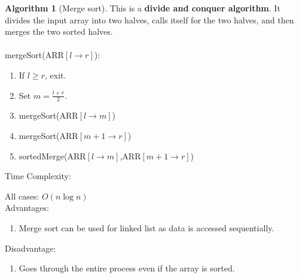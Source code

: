 \documentclass[10pt, a4paper]{extarticle}
\theoremstyle{definition}
\newtheorem{alg}{Algorithm}
\begin{document}
\begin{alg}[Merge sort]
	This is a \textbf{divide and conquer algorithm}. It divides the input array into two halves, calls itself for the two halves, and then merges the two sorted halves.\\ \\
	mergeSort(ARR$[l\to r]$):
	\begin{enumerate}
		\item If $l\geq r$, exit.
		\item Set $m=\frac{l+r}{2}$.
		\item mergeSort(ARR$[l\to m]$)
		\item mergeSort(ARR$[m+1\to r]$)
		\item sortedMerge(ARR$[l\to m]$,ARR$[m+1\to r]$)
	\end{enumerate}
	Time Complexity:

	All cases: $O(n\log n)$
	\hfill\\
	Advantages:
	\begin{enumerate}
		\item Merge sort can be used for linked list as data is accessed sequentially.
	\end{enumerate}
	Disadvantage:
	\begin{enumerate}
		\item Goes through the entire process even if the array is sorted.
	\end{enumerate}
\end{alg}
\end{document}
